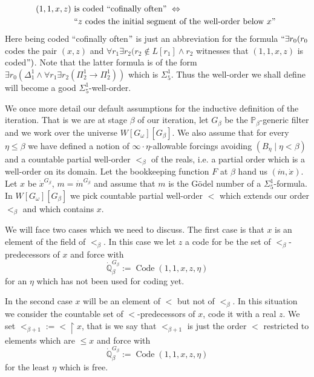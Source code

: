 \documentclass[a4paper,11pt]{article}
\newcommand{\forceP}{\mathbb{P}}
\newcommand{\forceQ}{\mathbb{Q}}
\begin{document}
\begin{align*}
(1,1,x,z) &\text{ is coded ``cofinally often$"$ }  \Leftrightarrow \\& \text{ ``$z$ codes the initial segment of the well-order below $x"$ }
\end{align*}
Here being coded ``cofinally often$"$ is just an abbreviation for the formula $``\exists r_0  ( r_0$ codes the pair $(x,z)$ and $\forall r_1 \exists r_2 ( r_2 \notin L[r_1] \land r_2$ witnesses that $(1,1,x,z)$ is coded$")$. Note that the latter formula is of the form $\exists r_0  (\Delta_1^1  \land \forall r_1 \exists r_2 (\Pi^1_2 \rightarrow \Pi^1_2))$ which is $\Sigma^1_5$.
Thus the well-order we shall define will become a good $\Sigma^1_5$-well-order.


We once more detail our default assumptions for the inductive definition of the iteration. That is  we are at stage $\beta$ of our iteration, let $G_{\beta}$ be the $\forceP_{\beta}$-generic filter and we work over the universe $W[G_{\omega}] [G_{\beta}]$. We also assume that for every $\eta \le \beta$ we  have defined a notion of $\infty \cdot \eta$-allowable forcings avoiding $(B_{\eta} \mid \eta < \beta)$ and a countable partial well-order $<_{\beta}$ of the reals, i.e. a partial order which is a well-order on its domain.
Let the bookkeeping function $F$ at $\beta$ hand us $(\dot{m},\dot{x})$. Let $x$ be $\dot{x}^{G_{\beta}}$, $m= \dot{m}^{G_{\beta}}$ and assume that $m$ is the G\"odel number of a $\Sigma^1_5$-formula.  In $W[G_{\omega}][G_{\beta}]$ we pick countable partial well-order $<$ which extends our order $<_{\beta}$ and which contains $x$.

We will face two cases which we need to discuss. The first case is that $x$ is an element of the field of $<_{\beta}$. In this case we let $z$ a code for be the set of $<_{\beta}$-predecessors of $x$ and force with
\[ \dot{\forceQ}_{\beta}^{G_{\beta}} := \operatorname{Code} (1,1,x,z,\eta) \]
for an $\eta$ which has not been used for coding yet.

In the second case $x$ will be an element of $<$ but not of $<_{\beta}$. In this situation we consider the countable set of $<$-predecessors of $x$, code it with a real $z$. We set $<_{\beta+1} := < \upharpoonright x$, that  is  we say that $<_{\beta+1}$ is just the order $<$ restricted to elements which are $\le x$  and
force with
\[ \dot{\forceQ}_{\beta}^{G_{\beta}}:= \operatorname{Code} (1,1,x,z,\eta) \]
for the least $\eta$ which is free.
\end{document}
